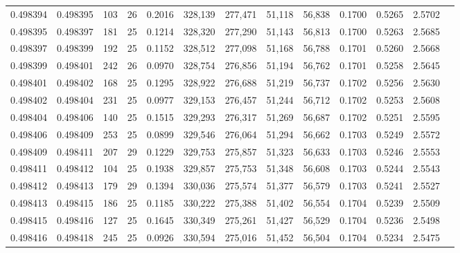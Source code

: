 \begin{tabular}{rrrrrrrrrrrrr}
0.498394 & 0.498395 & 103 &  26 &                                     0.2016 & 328,139 & 277,471 &  51,118 &  56,838 & 0.1700 & 0.5265 & 2.5702 \\
0.498395 & 0.498397 & 181 &  25 &                                     0.1214 & 328,320 & 277,290 &  51,143 &  56,813 & 0.1700 & 0.5263 & 2.5685 \\
0.498397 & 0.498399 & 192 &  25 &                                     0.1152 & 328,512 & 277,098 &  51,168 &  56,788 & 0.1701 & 0.5260 & 2.5668 \\
0.498399 & 0.498401 & 242 &  26 &                                     0.0970 & 328,754 & 276,856 &  51,194 &  56,762 & 0.1701 & 0.5258 & 2.5645 \\
0.498401 & 0.498402 & 168 &  25 &                                     0.1295 & 328,922 & 276,688 &  51,219 &  56,737 & 0.1702 & 0.5256 & 2.5630 \\
0.498402 & 0.498404 & 231 &  25 &                                     0.0977 & 329,153 & 276,457 &  51,244 &  56,712 & 0.1702 & 0.5253 & 2.5608 \\
0.498404 & 0.498406 & 140 &  25 &                                     0.1515 & 329,293 & 276,317 &  51,269 &  56,687 & 0.1702 & 0.5251 & 2.5595 \\
0.498406 & 0.498409 & 253 &  25 &                                     0.0899 & 329,546 & 276,064 &  51,294 &  56,662 & 0.1703 & 0.5249 & 2.5572 \\
0.498409 & 0.498411 & 207 &  29 &                                     0.1229 & 329,753 & 275,857 &  51,323 &  56,633 & 0.1703 & 0.5246 & 2.5553 \\
0.498411 & 0.498412 & 104 &  25 &                                     0.1938 & 329,857 & 275,753 &  51,348 &  56,608 & 0.1703 & 0.5244 & 2.5543 \\
0.498412 & 0.498413 & 179 &  29 &                                     0.1394 & 330,036 & 275,574 &  51,377 &  56,579 & 0.1703 & 0.5241 & 2.5527 \\
0.498413 & 0.498415 & 186 &  25 &                                     0.1185 & 330,222 & 275,388 &  51,402 &  56,554 & 0.1704 & 0.5239 & 2.5509 \\
0.498415 & 0.498416 & 127 &  25 &                                     0.1645 & 330,349 & 275,261 &  51,427 &  56,529 & 0.1704 & 0.5236 & 2.5498 \\
0.498416 & 0.498418 & 245 &  25 &                                     0.0926 & 330,594 & 275,016 &  51,452 &  56,504 & 0.1704 & 0.5234 & 2.5475 \\

\end{tabular}
